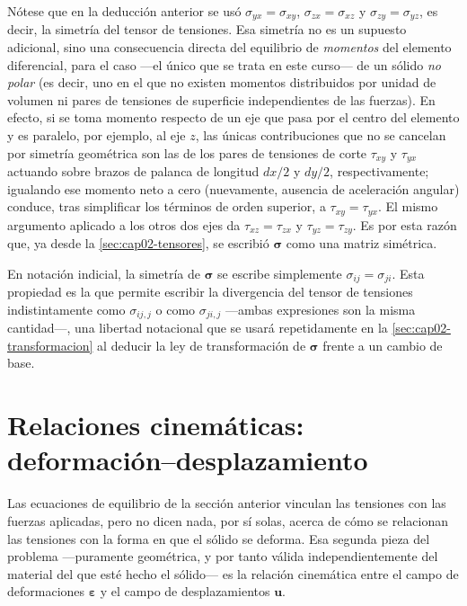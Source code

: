 Nótese que en la deducción anterior se usó $\sigma_{yx}=\sigma_{xy}$, $\sigma_{zx}=\sigma_{xz}$ y $\sigma_{zy}=\sigma_{yz}$, es decir, la simetría del tensor de tensiones. Esa simetría no es un supuesto adicional, sino una consecuencia directa del equilibrio de \emph{momentos} del elemento diferencial, para el caso —el único que se trata en este curso— de un sólido \emph{no polar} (es decir, uno en el que no existen momentos distribuidos por unidad de volumen ni pares de tensiones de superficie independientes de las fuerzas). En efecto, si se toma momento respecto de un eje que pasa por el centro del elemento y es paralelo, por ejemplo, al eje $z$, las únicas contribuciones que no se cancelan por simetría geométrica son las de los pares de tensiones de corte $\tau_{xy}$ y $\tau_{yx}$ actuando sobre brazos de palanca de longitud $dx/2$ y $dy/2$, respectivamente; igualando ese momento neto a cero (nuevamente, ausencia de aceleración angular) conduce, tras simplificar los términos de orden superior, a $\tau_{xy}=\tau_{yx}$. El mismo argumento aplicado a los otros dos ejes da $\tau_{xz}=\tau_{zx}$ y $\tau_{yz}=\tau_{zy}$. Es por esta razón que, ya desde la \cref{sec:cap02-tensores}, se escribió $\bm\sigma$ como una matriz simétrica.

\begin{observacion}
En notación indicial, la simetría de $\bm\sigma$ se escribe simplemente $\sigma_{ij}=\sigma_{ji}$. Esta propiedad es la que permite escribir la divergencia del tensor de tensiones indistintamente como $\sigma_{ij,j}$ o como $\sigma_{ji,j}$ —ambas expresiones son la misma cantidad—, una libertad notacional que se usará repetidamente en la \cref{sec:cap02-transformacion} al deducir la ley de transformación de $\bm\sigma$ frente a un cambio de base.
\end{observacion}

\section{Relaciones cinemáticas: deformación--desplazamiento}
\label{sec:cap02-cinematica}

Las ecuaciones de equilibrio de la sección anterior vinculan las tensiones con las fuerzas aplicadas, pero no dicen nada, por sí solas, acerca de cómo se relacionan las tensiones con la forma en que el sólido se deforma. Esa segunda pieza del problema —puramente geométrica, y por tanto válida independientemente del material del que esté hecho el sólido— es la relación cinemática entre el campo de deformaciones $\bm\varepsilon$ y el campo de desplazamientos $\bm u$.

